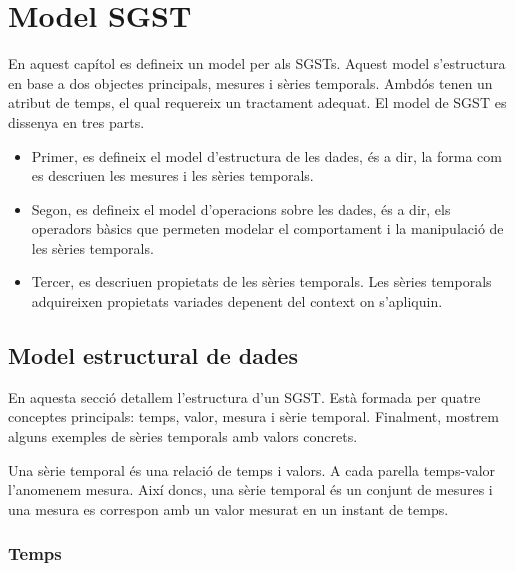 
\chapter{Model SGST}
\label{cap:model:sgst}


En aquest capítol es defineix un model per als \glspl{SGST}. Aquest model
s'estructura en base a dos objectes principals, mesures i sèries temporals.
Ambdós tenen un atribut de temps, el qual requereix un tractament
adequat. El model de \gls{SGST} es dissenya en tres parts.

\begin{itemize}

\item Primer, es defineix el model d'estructura de les dades, és a
  dir, la forma com es descriuen les mesures i les sèries temporals.  

\item Segon, es defineix el model d'operacions sobre les dades, és a
  dir, els operadors bàsics que permeten modelar el comportament i la
  manipulació de les sèries temporals.

\item Tercer, es descriuen propietats de les sèries
  temporals. Les sèries temporals adquireixen propietats
  variades depenent del context on s'apliquin.

\end{itemize}





\section{Model estructural de dades}

En aquesta secció detallem l'estructura d'un \gls{SGST}. Està formada
per quatre conceptes principals: temps, valor, mesura i sèrie
temporal. Finalment, mostrem alguns exemples de sèries temporals amb valors
concrets.

Una sèrie temporal és una relació de temps i valors. A cada parella
temps-valor l'anomenem mesura. Així doncs, una sèrie temporal és un
conjunt de mesures i una mesura es correspon amb un valor mesurat en
un instant de temps.





\subsection{Temps}
\label{sec:sgst:temps}

